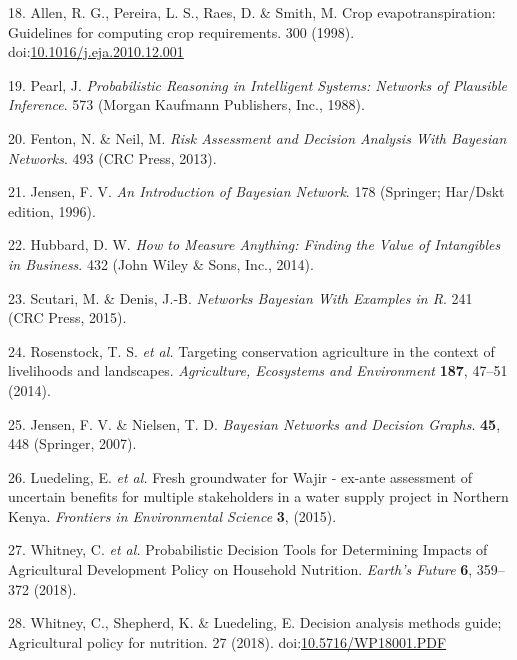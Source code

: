 \documentclass[11pt,preprint]{article}
\begin{document}
\leavevmode\hypertarget{ref-Allen_et_al_1998}{}%
18. Allen, R. G., Pereira, L. S., Raes, D. \& Smith, M. Crop
evapotranspiration: Guidelines for computing crop requirements. 300
(1998).
doi:\href{https://doi.org/10.1016/j.eja.2010.12.001}{10.1016/j.eja.2010.12.001}

\leavevmode\hypertarget{ref-Pearl_1988}{}%
19. Pearl, J. \emph{Probabilistic Reasoning in Intelligent Systems:
Networks of Plausible Inference}. 573 (Morgan Kaufmann Publishers, Inc.,
1988).

\leavevmode\hypertarget{ref-Fenton_and_Neil_2013}{}%
20. Fenton, N. \& Neil, M. \emph{Risk Assessment and Decision Analysis
With Bayesian Networks}. 493 (CRC Press, 2013).

\leavevmode\hypertarget{ref-Jensen_1996}{}%
21. Jensen, F. V. \emph{An Introduction of Bayesian Network}. 178
(Springer; Har/Dskt edition, 1996).

\leavevmode\hypertarget{ref-Hubbard_2014}{}%
22. Hubbard, D. W. \emph{How to Measure Anything: Finding the Value of
Intangibles in Business}. 432 (John Wiley \& Sons, Inc., 2014).

\leavevmode\hypertarget{ref-Scutari_and_Denis_2015}{}%
23. Scutari, M. \& Denis, J.-B. \emph{Networks Bayesian With Examples in
R}. 241 (CRC Press, 2015).

\leavevmode\hypertarget{ref-Rosenstock_et_al_2014}{}%
24. Rosenstock, T. S. \emph{et al.} Targeting conservation agriculture
in the context of livelihoods and landscapes. \emph{Agriculture,
Ecosystems and Environment} \textbf{187}, 47--51 (2014).

\leavevmode\hypertarget{ref-Jensen_and_Nielsen_2007}{}%
25. Jensen, F. V. \& Nielsen, T. D. \emph{Bayesian Networks and Decision
Graphs}. \textbf{45}, 448 (Springer, 2007).

\leavevmode\hypertarget{ref-Luedeling_et_al_2015}{}%
26. Luedeling, E. \emph{et al.} Fresh groundwater for Wajir - ex-ante
assessment of uncertain benefits for multiple stakeholders in a water
supply project in Northern Kenya. \emph{Frontiers in Environmental
Science} \textbf{3}, (2015).

\leavevmode\hypertarget{ref-Whitney_et_al_2018}{}%
27. Whitney, C. \emph{et al.} Probabilistic Decision Tools for
Determining Impacts of Agricultural Development Policy on Household
Nutrition. \emph{Earth's Future} \textbf{6}, 359--372 (2018).

\leavevmode\hypertarget{ref-Whitney_et_al_2018a}{}%
28. Whitney, C., Shepherd, K. \& Luedeling, E. Decision analysis methods
guide; Agricultural policy for nutrition. 27 (2018).
doi:\href{https://doi.org/10.5716/WP18001.PDF}{10.5716/WP18001.PDF}
\end{document}
